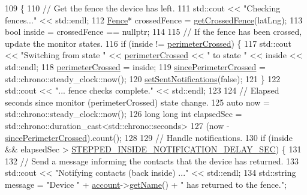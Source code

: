 \begin{DoxyCode}
109 \{
110     \textcolor{comment}{// Get the fence the device has left.}
111     std::cout << \textcolor{stringliteral}{"Checking fences..."} << std::endl;
112     \hyperlink{class_fence}{Fence}* crossedFence = \hyperlink{class_monitor_state_a332c5f42bf46cd217e36f300e5279766}{getCrossedFence}(latLng);
113     \textcolor{keywordtype}{bool} inside = crossedFence == \textcolor{keyword}{nullptr};
114 
115     \textcolor{comment}{// If the fence has been crossed, update the monitor states.}
116     \textcolor{keywordflow}{if} (inside != \hyperlink{class_active_monitor_state_af4c93e1be350ea9cf4ac97f97abaf79e}{perimeterCrossed}) \{
117         std::cout << \textcolor{stringliteral}{"Switching from state "} << \hyperlink{class_active_monitor_state_af4c93e1be350ea9cf4ac97f97abaf79e}{perimeterCrossed} << \textcolor{stringliteral}{" to state "} << inside 
      << std::endl;
118         \hyperlink{class_active_monitor_state_af4c93e1be350ea9cf4ac97f97abaf79e}{perimeterCrossed} = inside;
119         \hyperlink{class_active_monitor_state_a4313399b0922fccd66ecea2fcf77c08f}{sincePerimeterCrossed} = std::chrono::steady\_clock::now();
120         \hyperlink{class_active_monitor_state_adedd023d280922991a5dd980017549ec}{setSentNotifications}(\textcolor{keyword}{false});
121     \}
122     std::cout << \textcolor{stringliteral}{"... fence checks complete."} << std::endl;
123 
124     \textcolor{comment}{// Elapsed seconds since monitor (perimeterCrossed) state change.}
125     \textcolor{keyword}{auto} now = std::chrono::steady\_clock::now();
126     \textcolor{keywordtype}{long} \textcolor{keywordtype}{long} \textcolor{keywordtype}{int} elapsedSec = std::chrono::duration\_cast<std::chrono::seconds>
127             (now - \hyperlink{class_active_monitor_state_a4313399b0922fccd66ecea2fcf77c08f}{sincePerimeterCrossed}).count();
128 
129     \textcolor{comment}{// Handle notifications.}
130     \textcolor{keywordflow}{if} (inside && elapsedSec > \hyperlink{_active_monitor_state_8cpp_af734ccbfe87f3ed675b4836ae5761dbb}{STEPPED\_INSIDE\_NOTIFICATION\_DELAY\_SEC}) 
      \{
131 
132         \textcolor{comment}{// Send a message informing the contacts that the device has returned.}
133         std::cout << \textcolor{stringliteral}{"Notifying contacts (back inside) ..."} << std::endl;
134         std::string message = \textcolor{stringliteral}{"Device "} + \hyperlink{class_monitor_state_a41128d4942ec0d5b107c63d1d95af811}{account}->\hyperlink{class_account_a1ef22885e8c6f145475c3306a4e6d74a}{getName}() + \textcolor{stringliteral}{" has returned to the fence."};

\end{DoxyCode}
